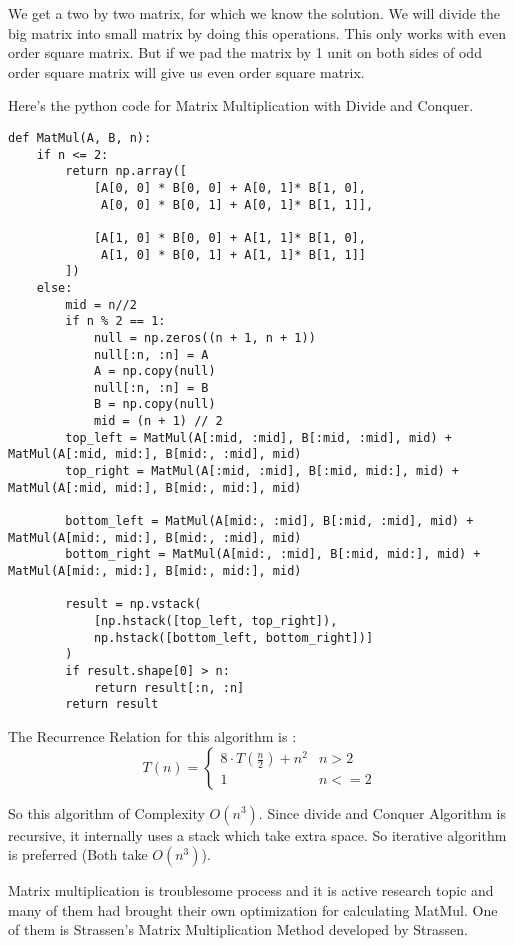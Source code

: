 \documentclass[11pt, a4paper]{article}
\begin{document}
We get a two by two matrix, for which we know the solution. We will divide the big matrix into small matrix by doing this operations. This only works with even order square matrix. But if we pad the matrix by 1 unit on both sides of odd order square matrix will give us even order square matrix. 

Here's the python code for Matrix Multiplication with Divide and Conquer.
\begin{verbatim}
def MatMul(A, B, n):
    if n <= 2:
        return np.array([
            [A[0, 0] * B[0, 0] + A[0, 1]* B[1, 0],
             A[0, 0] * B[0, 1] + A[0, 1]* B[1, 1]],
              
            [A[1, 0] * B[0, 0] + A[1, 1]* B[1, 0],
             A[1, 0] * B[0, 1] + A[1, 1]* B[1, 1]]
        ])
    else:
        mid = n//2
        if n % 2 == 1:
            null = np.zeros((n + 1, n + 1))
            null[:n, :n] = A
            A = np.copy(null)
            null[:n, :n] = B
            B = np.copy(null)
            mid = (n + 1) // 2
        top_left = MatMul(A[:mid, :mid], B[:mid, :mid], mid) + MatMul(A[:mid, mid:], B[mid:, :mid], mid)
        top_right = MatMul(A[:mid, :mid], B[:mid, mid:], mid) + MatMul(A[:mid, mid:], B[mid:, mid:], mid)
              
        bottom_left = MatMul(A[mid:, :mid], B[:mid, :mid], mid) + MatMul(A[mid:, mid:], B[mid:, :mid], mid)
        bottom_right = MatMul(A[mid:, :mid], B[:mid, mid:], mid) + MatMul(A[mid:, mid:], B[mid:, mid:], mid)

        result = np.vstack(
            [np.hstack([top_left, top_right]),
            np.hstack([bottom_left, bottom_right])]
        )
        if result.shape[0] > n:
            return result[:n, :n]
        return result
\end{verbatim}

The Recurrence Relation for this algorithm is :
\begin{equation}
    T(n) = 
    \begin{cases}
        8 \cdot T\left(\frac{n}{2}\right) + n^2 & n > 2\\
        1 & n <= 2
    \end{cases}
\end{equation}

So this algorithm of Complexity $O(n^3)$. Since divide and Conquer Algorithm is recursive, it internally uses a stack which take extra space. So iterative algorithm is preferred (Both take $O(n^3)$).

Matrix multiplication is troublesome process and it is active research topic and many of them had brought their own optimization for calculating MatMul. One of them is Strassen's Matrix Multiplication Method developed by Strassen.
\end{document}
